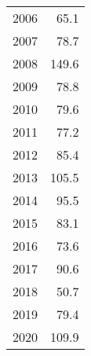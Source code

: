 \begin{table}[H]
{\begin{tabular}[t]{lr}
2006 &   65.1 \\
2007 &   78.7 \\
2008 &  149.6 \\
2009 &   78.8 \\
2010 &   79.6 \\
2011 &   77.2 \\
2012 &   85.4 \\
2013 &  105.5 \\
2014 &   95.5 \\
2015 &   83.1 \\
2016 &   73.6 \\
2017 &   90.6 \\
2018 &   50.7 \\
2019 &   79.4 \\
2020 &  109.9 \\
\bottomrule
\end{tabular}
}
    \label{tab:todasmax}
    \end{table}


    

    
    
    


